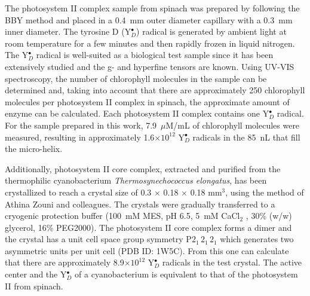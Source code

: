 The photosystem II complex sample from spinach was prepared by following the BBY method and placed in a 0.4~mm outer diameter capillary with a 0.3~mm inner diameter. \cite{BBY1981} The tyrosine D (Y$_D^\bullet$) radical is generated by ambient light at room temperature for a few minutes and then rapidly frozen in liquid nitrogen. The Y$_D^\bullet$ radical is well-suited as a biological test sample since it has been extensively studied and the g- and hyperfine tensors are known. \cite{Hofbauer6623} Using UV-VIS spectroscopy, the number of chlorophyll molecules in the sample can be determined and, taking into account that there are approximately 250 chlorophyll molecules per photosystem II complex in spinach, the approximate amount of enzyme can be calculated. Each photosystem II complex contains one Y$_D^\bullet$ radical. For the sample prepared in this work, 7.9~$\mu$M/mL of chlorophyll molecules were measured, resulting in approximately 1.6$\times10^{12}$ Y$_D^\bullet$ radicals in the 85~nL that fill the micro-helix. 

Additionally, photosystem II core complex, extracted and purified from the thermophilic cyanobacterium {\em Thermosynechococcus elongatus}, has been crystallized to reach a crystal size of 0.3 $\times$ 0.18 $\times$ 0.18 mm$^3$, using the method of Athina Zouni and colleagues. \cite{KERN2005147} The crystals were gradually transferred to a cryogenic protection buffer (100~mM MES, pH 6.5, 5~mM CaCl$_2$ , 30\% (w/w) glycerol, 16\% PEG2000). The photosystem II core complex forms a dimer and the crystal has a unit cell space group symmetry P${2_1\,2_1\,2_1}$ which generates two asymmetric units per unit cell (PDB ID: 1W5C). From this one can calculate that there are approximately 8.9$\times10^{12}$ Y$_D^\bullet$ radicals in the test crystal. The active center and the Y$_D^\bullet$ of a cyanobacterium is equivalent to that of the photosystem II from spinach. 

